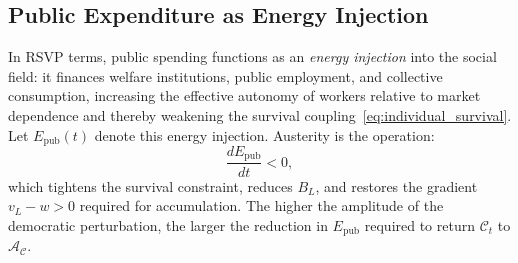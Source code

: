 \documentclass[12pt,a4paper]{article}
\theoremstyle{definition}
\theoremstyle{remark}
\begin{document}
\subsection{Public Expenditure as Energy Injection}

In RSVP terms, public spending functions as an \emph{energy injection} into the social field: it finances welfare institutions, public employment, and collective consumption, increasing the effective autonomy of workers relative to market dependence and thereby weakening the survival coupling~\eqref{eq:individual_survival}. Let $E_{\mathrm{pub}}(t)$ denote this energy injection. Austerity is the operation:
\begin{equation}
  \frac{dE_{\mathrm{pub}}}{dt} < 0,
\end{equation}
which tightens the survival constraint, reduces $B_L$, and restores the gradient $v_L - w > 0$ required for accumulation. The higher the amplitude of the democratic perturbation, the larger the reduction in $E_{\mathrm{pub}}$ required to return $\mathcal{C}_t$ to $\mathcal{A}_\mathcal{C}$.
\end{document}
